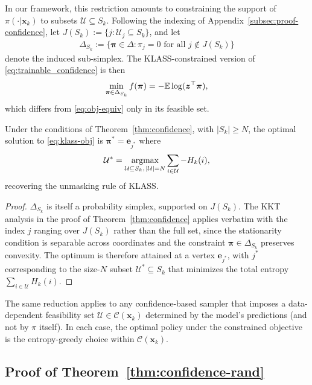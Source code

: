 In our framework, this restriction amounts to constraining the support of $\pi(\cdot | \bm x_k)$ to subsets $\mathcal U \subseteq S_k$. Following the indexing of Appendix~\ref{subsec:proof-confidence}, let $J(S_k) := \{j : \mathcal U_j \subseteq S_k\}$, and let
\begin{align*}
    \Delta_{S_k} := \{\bm\pi \in \Delta : \pi_j = 0 \text{ for all } j \notin J(S_k)\}
\end{align*}
denote the induced sub-simplex. The KLASS-constrained version of \eqref{eq:trainable_confidence} is then
\begin{align}\label{eq:klass-obj}
    \min_{\bm\pi \in \Delta_{S_k}} f(\bm\pi) = -\mathbb{E}\log(\bm z^\top \bm\pi),
\end{align}
which differs from \eqref{eq:obj-equiv} only in its feasible set.

\begin{proposition}\label{prop:klass}
Under the conditions of Theorem~\ref{thm:confidence}, with $|S_k| \geq N$, the optimal solution to \eqref{eq:klass-obj} is $\bm\pi^* = \bm e_{j^*}$ where
\begin{align*}
    \mathcal U^* = \operatorname*{argmax}_{\mathcal U \subseteq S_k,\, |\mathcal U| = N} \sum_{i \in \mathcal U} -H_k(i),
\end{align*}
recovering the unmasking rule of KLASS.
\end{proposition}

\begin{proof}
$\Delta_{S_k}$ is itself a probability simplex, supported on $J(S_k)$. The KKT analysis in the proof of Theorem~\ref{thm:confidence} applies verbatim with the index $j$ ranging over $J(S_k)$ rather than the full set, since the stationarity condition is separable across coordinates and the constraint $\bm\pi \in \Delta_{S_k}$ preserves convexity. The optimum is therefore attained at a vertex $\bm e_{j^*}$, with $j^*$ corresponding to the size-$N$ subset $\mathcal U^* \subseteq S_k$ that minimizes the total entropy $\sum_{i \in \mathcal U} H_k(i)$.
\end{proof}

The same reduction applies to any confidence-based sampler that imposes a data-dependent feasibility set $\mathcal U \in \mathcal C(\bm x_k)$ determined by the model's predictions (and not by $\pi$ itself). In each case, the optimal policy under the constrained objective is the entropy-greedy choice within $\mathcal C(\bm x_k)$.

\subsection{Proof of Theorem~\ref{thm:confidence-rand}}\label{subsec:proof-random}

